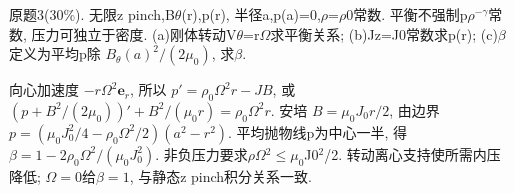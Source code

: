 \begin{exercise}\label{ex:06-mid-3}
原题3(30\%). 无限z pinch,B\ensuremath{\theta}(r),p(r), 半径a,p(a)=0,\ensuremath{\rho}=\ensuremath{\rho}0常数. 平衡不强制p\ensuremath{\rho}$^{-\gamma}$常数, 压力可独立于密度. (a)刚体转动V\ensuremath{\theta}=r\ensuremath{\Omega}求平衡关系; (b)Jz=J0常数求p(r); (c)\ensuremath{\beta}定义为平均p除 $B_\theta(a)^2/(2\mu_0)$, 求\ensuremath{\beta}.
\end{exercise}
\begin{solution}
向心加速度 $-r\Omega^2\mathbf e_r$, 所以 $p'=\rho_0\Omega^2r-JB$, 或 $(p+B^2/(2\mu_0))'+B^2/(\mu_0r)=\rho_0\Omega^2r$. 安培 $B=\mu_0J_0r/2$, 由边界
$p=(\mu_0J_0^2/4-\rho_0\Omega^2/2)(a^2-r^2)$.
平均抛物线p为中心一半, 得 $\beta=1-2\rho_0\Omega^2/(\mu_0J_0^2)$. 非负压力要求\ensuremath{\rho}\ensuremath{\Omega}\ensuremath{{}^{2}}\ensuremath{\le}$\mu_0$J0\ensuremath{{}^{2}}/2. 转动离心支持使所需内压降低; $\Omega=0$给$\beta=1$, 与静态z pinch积分关系一致.
\end{solution}

